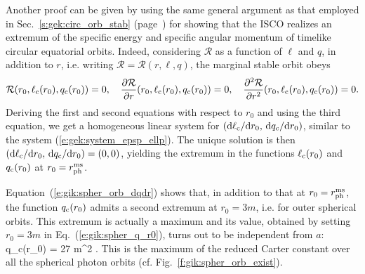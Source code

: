 \begin{remark}
Another proof can be given by using the same general argument as that employed in
Sec.~\ref{s:gek:circ_orb_stab} (page~\pageref{p:gek:ISCO_extremum_eps_ell})
for showing that the ISCO realizes an extremum of the specific energy
and specific angular momentum of timelike circular equatorial orbits.
Indeed, considering $\mathcal{R}$ as a function of $\ell$ and $q$, in addition
to $r$, i.e. writing $\mathcal{R} = \mathcal{R}(r, \ell, q)$, the marginal
stable orbit obeys
\[
    \mathcal{R}(r_0, \ell_{\rm c}(r_0), q_{\rm c}(r_0)) = 0,\quad
    \frac{\partial \mathcal{R}}{\partial r}(r_0, \ell_{\rm c}(r_0), q_{\rm c}(r_0)) = 0,\quad
    \frac{\partial^2\mathcal{R}}{\partial r^2} (r_0, \ell_{\rm c}(r_0), q_{\rm c}(r_0)) = 0 .
\]
Deriving the first and second equations with respect to $r_0$
and using the third equation, we get a homogeneous linear
system for $(\mathrm{d}\ell_{\rm c}/\mathrm{d} r_0,\, \mathrm{d} q_{\rm c}/\mathrm{d} r_0)$, similar to the
system (\ref{e:gek:system_epsp_ellp}). The unique solution
is then $(\mathrm{d}\ell_{\rm c}/\mathrm{d} r_0,\, \mathrm{d} q_{\rm c}/\mathrm{d} r_0) = (0, 0)$, yielding the extremum in the
functions $\ell_{\rm c}(r_0)$ and $q_{\rm c}(r_0)$ at $r_0 = r_{\rm ph}^{\rm ms}$.
\end{remark}

Equation~(\ref{e:gik:spher_orb_dqdr}) shows that, in addition to that
at $r_0 = r_{\rm ph}^{\rm ms}$, the function $q_{\rm c}(r_0)$ admits
a second extremum at $r_0 = 3m$, i.e. for outer spherical orbits.
This extremum is actually a maximum and its value, obtained by
setting $r_0 = 3 m$ in Eq.~(\ref{e:gik:spher_q_r0}),
turns out to be independent from $a$:
\be \label{e:gik:spher_max_q}
    \max q_{\rm c}(r_0) = 27 m^2 .
\ee
This is the maximum of the reduced Carter constant over all the spherical photon
orbits (cf. Fig.~\ref{f:gik:spher_orb_exist}).


